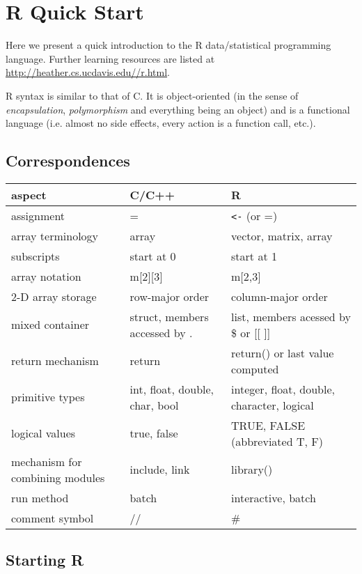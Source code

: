 \chapter{R Quick Start}
\label{chap:rquickstart}

Here we present a quick introduction to the R data/statistical
programming language.  Further learning resources are listed at
\url{http://heather.cs.ucdavis.edu//r.html}.

R syntax is similar to that of C. It is object-oriented (in the sense of
{\it encapsulation}, {\it polymorphism} and everything being an object)
and is a functional language (i.e. almost no side effects, every action
is a function call, etc.).

\section{Correspondences}

\begin{tabular}{|l|l|l|}
\hline
aspect & C/C++ & R \\ \hline 
\hline
assignment & = & \verb#<-# (or =) \\ \hline 
array terminology & array & vector, matrix, array \\ \hline 
subscripts & start at 0 & start at 1 \\ \hline
array notation & m[2][3] & m[2,3] \\ \hline 
2-D array storage & row-major order & column-major order \\ \hline 
mixed container &struct, members accessed by . & list, members acessed by
\$ or [[ ]] \\ \hline 
return mechanism & return & return() or last value computed \\ \hline
primitive types & int, float, double, char, bool & integer, float,
double, character, logical \\ \hline
logical values & true, false & TRUE, FALSE (abbreviated T, F) \\ \hline
mechanism for combining modules & include, link & library() \\ \hline
run method & batch & interactive, batch \\ \hline
comment symbol & // & \#\\ \hline
\end{tabular}

\section{Starting R}

